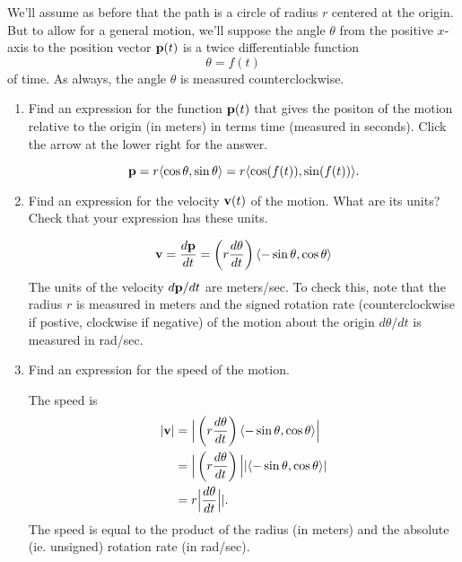 \documentclass{ximera}
\begin{document}
\begin{question} \label{Q324234fgfg}
We'll assume as before that the path is a circle of radius $r$ centered at the origin. But to allow for a general motion, we'll suppose the angle $\theta$ from the positive $x$-axis to the position vector ${\bf p}(t)$ is a twice differentiable function
\[
   \theta = f(t)
\]
of time. As always, the angle $\theta$ is measured counterclockwise. 

\begin{enumerate}
\item Find an expression for the function ${\bf p}(t)$ that gives the positon of the motion relative to the origin (in meters) in terms time (measured in seconds). Click the arrow at the lower right for the answer.

\begin{expandable}
\[
   {\bf p} = r \langle \cos \theta , \sin\theta \rangle = r \langle \cos (f(t)) , \sin (f(t)) \rangle .
\]
\end{expandable}

\item Find an expression for the velocity ${\bf v}(t)$ of the motion. What are its units? Check that your expression has these units.
\begin{expandable}
\[
   {\bf v} = \frac{d{\bf p}}{dt}  = \left( r \frac{d\theta}{dt} \right) \langle -\sin \theta , \cos\theta \rangle  \\
\]
The units of the velocity $d{\bf p}/dt$ are meters/sec. To check this, note that the radius $r$ is measured in meters and the signed rotation rate (counterclockwise if postive, clockwise if negative) of the motion about the origin $d\theta/dt$ is measured in rad/sec.
\end{expandable}

\item Find an expression for the speed of the motion.

\begin{expandable}
The speed is
\begin{align*}
  | {\bf v} |  & = \Big|  \left( r \frac{d\theta}{dt} \right) \langle -\sin \theta , \cos\theta \rangle \Big|   \\
                & =  \Big| \left( r \frac{d\theta}{dt} \right) \Big| |  \langle -\sin \theta , \cos\theta \rangle  | \\
                &= r \Big|\frac{d\theta}{dt} \Big| | .
\end{align*}
The speed is equal to the product of the radius (in meters) and the absolute (ie. unsigned) rotation rate (in rad/sec).
\end{expandable}


\end{enumerate}
\end{question}
\end{document}
